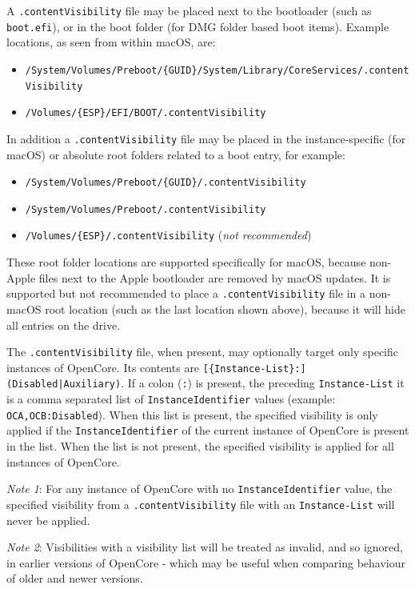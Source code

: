 \documentclass[]{article}
\providecommand{\tightlist}{%
  \setlength{\itemsep}{0pt}\setlength{\parskip}{0pt}}
\begin{document}
A \texttt{.contentVisibility} file may be placed next to the bootloader (such as \texttt{boot.efi}),
or in the boot folder (for DMG folder based boot items). Example locations, as seen from within macOS, are:
\begin{itemize}
\tightlist
\item \texttt{/System/Volumes/Preboot/\{GUID\}/System/Library/CoreServices/.contentVisibility}
\item \texttt{/Volumes/\{ESP\}/EFI/BOOT/.contentVisibility}
\end{itemize}
In addition a \texttt{.contentVisibility} file may be placed in the instance-specific (for macOS) or absolute
root folders related to a boot entry, for example:
\begin{itemize}
\tightlist
\item \texttt{/System/Volumes/Preboot/\{GUID\}/.contentVisibility}
\item \texttt{/System/Volumes/Preboot/.contentVisibility}
\item \texttt{/Volumes/\{ESP\}/.contentVisibility} (\emph{not recommended})
\end{itemize}
These root folder locations are supported specifically for macOS, because non-Apple files next to the Apple bootloader
are removed by macOS updates. It is supported but not recommended to place a \texttt{.contentVisibility} file in a
non-macOS root location (such as the last location shown above), because it will hide all entries on the drive.

The \texttt{.contentVisibility} file, when present, may optionally target only specific instances
of OpenCore. Its contents are \texttt{[\{Instance-List\}:](Disabled|Auxiliary)}.
If a colon (\texttt{:}) is present, the preceding \texttt{Instance-List} it is a comma separated
list of \texttt{InstanceIdentifier} values (example: \texttt{OCA,OCB:Disabled}).
When this list is present, the specified visibility is only applied if the
\texttt{InstanceIdentifier} of the current instance of OpenCore is present in the list.
When the list is not present, the specified visibility is applied for all instances of OpenCore.

\emph{Note 1}: For any instance of OpenCore with no \texttt{InstanceIdentifier} value, the specified visibility
from a \texttt{.contentVisibility} file with an \texttt{Instance-List} will never be applied.

\emph{Note 2}: Visibilities with a visibility list will be treated as invalid, and so ignored, in earlier
versions of OpenCore - which may be useful when comparing behaviour of older and newer versions.
\end{document}
